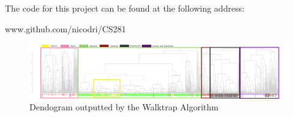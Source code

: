 \documentclass[twoside]{article}
\begin{document}
\begin{multicols}{2}
The code for this project can be found at the following address:

\begin{center}
www.github.com/nicodri/CS281
\end{center}



\nocite{*} %


\end{multicols}

\newpage

\begin{figure}
\centering
\includegraphics[angle=90,width=0.25\linewidth]{img/den_ovi2-1.png}
\caption{Dendogram outputted by the Walktrap Algorithm}
\end{figure}
\end{document}
